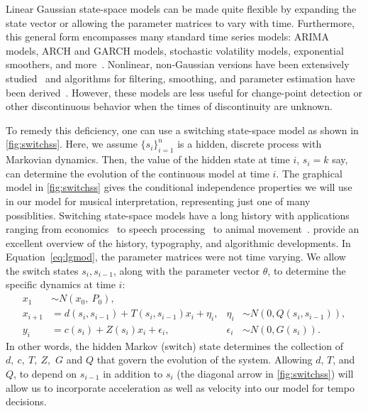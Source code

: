 \documentclass[aoas]{imsart}
\begin{document}
Linear Gaussian state-space models can be made quite flexible
by expanding the state vector or allowing the parameter matrices to
vary with time. Furthermore, this general form encompasses many
standard time series models: ARIMA models, ARCH and GARCH models,
stochastic volatility models, exponential smoothers, and
more~\citep[see][for many other
examples]{DurbinKoopman2001}. Nonlinear, non-Gaussian versions have
been extensively
studied~\citep{DurbinKoopman1997,Fuh2006,Kitagawa1987,Kitagawa1996}
and algorithms for filtering, smoothing, and parameter estimation have
been derived~\citep[for example,][]{KoyamaPerez-Bolde2010,AndrieuDoucet2010}. 
However, these models are less useful
for change-point detection or other discontinuous behavior
when the times of discontinuity are unknown. 

To remedy this deficiency, one can use a switching state-space
model as shown in \autoref{fig:switchss}. Here, we assume $\{s_i\}_{i=1}^n$ is a
hidden, discrete process with Markovian dynamics. Then, the value of
the hidden state at time $i$, $s_i=k$ say, can determine the evolution of
the continuous model at time $i$. The graphical model in
\autoref{fig:switchss} gives the conditional independence properties
we will use in our model for musical interpretation, 
representing just one of many possiblities. Switching state-space models have a long
history with applications ranging from
economics~\citep{KimNelson1998,Kim1994,Hamilton2011} to speech
processing~\citep{FoxSudderth2011} to animal
movement~\citep{PattersonThomas2008,BlockJonsen2011}. \citet{GhahramaniHinton2000}
provide an excellent overview of the history, 
typography, and algorithmic developments. In Equation~\eqref{eq:lgmod}, the
parameter matrices were not time varying. We
allow the switch states $s_i, s_{i-1}$, along with the parameter
vector $\theta$, to determine the specific dynamics at time $i$:
\begin{equation}
  \begin{aligned}
    x_1 &\sim N(x_0,\ P_0),\\
    x_{i+1}&= d(s_i,s_{i-1})+T(s_i,s_{i-1}) x_i + \eta_i, 
    & \eta_i &\sim N(0,Q(s_i,s_{i-1})),\\
    y_i&= c(s_i) + Z(s_i) x_i + \epsilon_i, & \epsilon_i &\sim N(0, G(s_i)).
  \end{aligned}
\end{equation}
In other words, the hidden Markov (switch) state determines the
collection of $d,\ c,\ T,\ Z,$ $G$ and $Q$
that govern the evolution of the system. Allowing $d$, $T$, and $Q$,
to depend on $s_{i-1}$ in addition to $s_i$ (the diagonal arrow in
\autoref{fig:switchss}) will allow us to incorporate acceleration as
well as velocity into our model for tempo decisions.
\end{document}
